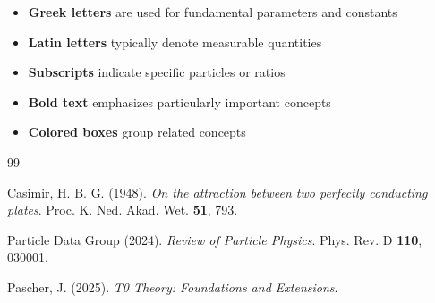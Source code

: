 	\begin{itemize}
		\item \textbf{Greek letters} are used for fundamental parameters and constants
		\item \textbf{Latin letters} typically denote measurable quantities
		\item \textbf{Subscripts} indicate specific particles or ratios
		\item \textbf{Bold text} emphasizes particularly important concepts
		\item \textbf{Colored boxes} group related concepts
	\end{itemize}
	
	\begin{thebibliography}{99}
		
		Casimir, H. B. G. (1948). \textit{On the attraction between two perfectly conducting plates}.
		Proc. K. Ned. Akad. Wet. \textbf{51}, 793.
		
		Particle Data Group (2024). \textit{Review of Particle Physics}.
		Phys. Rev. D \textbf{110}, 030001.
		
		Pascher, J. (2025). \textit{T0 Theory: Foundations and Extensions}.

	\end{thebibliography}
